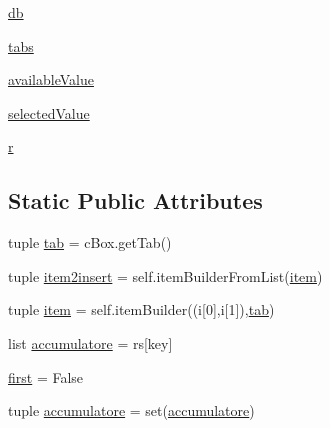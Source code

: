 \begin{DoxyCompactItemize}
\item 
\hyperlink{classmmasgis_1_1interrogazioni_1_1MainWindowQuery_a245a58e04601b257d0b6758504419805}{db}
\item 
\hyperlink{classmmasgis_1_1interrogazioni_1_1MainWindowQuery_af521bf43e9c649a9138e961aa5287d83}{tabs}
\item 
\hyperlink{classmmasgis_1_1interrogazioni_1_1MainWindowQuery_ac33653f9d5c45f4668f3d91c4b09c0e3}{availableValue}
\item 
\hyperlink{classmmasgis_1_1interrogazioni_1_1MainWindowQuery_aaa46d213a2d98f2a10b2f15be684681b}{selectedValue}
\item 
\hyperlink{classmmasgis_1_1interrogazioni_1_1MainWindowQuery_a92257bc4db8723db9b5923c93250e591}{r}
\end{DoxyCompactItemize}
\subsection*{Static Public Attributes}
\begin{DoxyCompactItemize}
\item 
tuple \hyperlink{classmmasgis_1_1interrogazioni_1_1MainWindowQuery_a22b21dcd259677f225aa80829f26b1ef}{tab} = cBox.getTab()
\item 
tuple \hyperlink{classmmasgis_1_1interrogazioni_1_1MainWindowQuery_a2748edce18efb7510312e33237f813ef}{item2insert} = self.itemBuilderFromList(\hyperlink{classmmasgis_1_1interrogazioni_1_1MainWindowQuery_a6e8b62235da443f77866fe46b3b0a04c}{item})
\item 
tuple \hyperlink{classmmasgis_1_1interrogazioni_1_1MainWindowQuery_a6e8b62235da443f77866fe46b3b0a04c}{item} = self.itemBuilder((i\mbox{[}0\mbox{]},i\mbox{[}1\mbox{]}),\hyperlink{classmmasgis_1_1interrogazioni_1_1MainWindowQuery_a22b21dcd259677f225aa80829f26b1ef}{tab})
\item 
list \hyperlink{classmmasgis_1_1interrogazioni_1_1MainWindowQuery_ab3235a683ef67c1de31ba5355151c318}{accumulatore} = rs\mbox{[}key\mbox{]}
\item 
\hyperlink{classmmasgis_1_1interrogazioni_1_1MainWindowQuery_ad3e40890508f21cc5a9b69ea7ce91846}{first} = False
\item 
tuple \hyperlink{classmmasgis_1_1interrogazioni_1_1MainWindowQuery_ac13f788bdb838bfafacdfc1313188058}{accumulatore} = set(\hyperlink{classmmasgis_1_1interrogazioni_1_1MainWindowQuery_ab3235a683ef67c1de31ba5355151c318}{accumulatore})
\end{DoxyCompactItemize}


